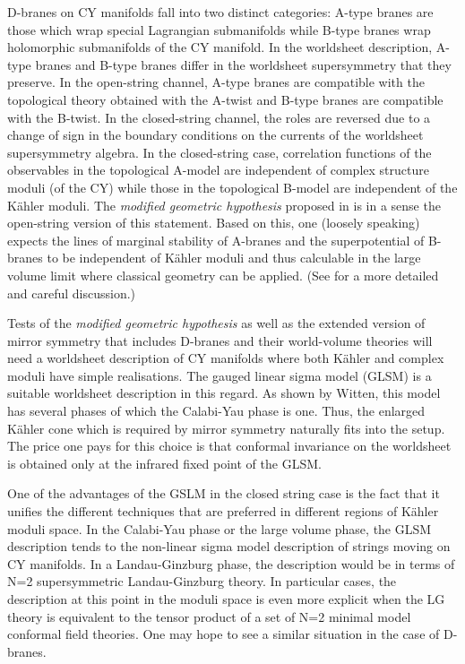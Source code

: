 \documentclass[a4paper,12pt]{article}
\begin{document}
D-branes on CY manifolds fall into two distinct categories: A-type branes
are those which wrap special Lagrangian submanifolds while B-type branes
wrap holomorphic submanifolds of the CY manifold. In the worldsheet
description\cite{ooy}, A-type branes and B-type branes differ in the
worldsheet supersymmetry that they preserve. In the open-string channel,
A-type branes are compatible with the topological theory obtained with the
A-twist and B-type branes are compatible with the B-twist. In the
closed-string channel, the roles are reversed due to a change of sign in
the boundary conditions on the \coordHE{} currents of the \coordHE{} worldsheet
supersymmetry algebra. In the closed-string case\cite{topwitten},
correlation functions of the observables in the topological A-model are
independent of complex structure moduli (of the CY) while those in the
topological B-model are independent of the K\"ahler moduli. The {\it
modified geometric hypothesis} proposed in \cite{quintic,doug1} is in a
sense the open-string version of this statement. Based on this, one
(loosely speaking) expects the lines of marginal stability of A-branes and
the superpotential of B-branes to be independent of K\"ahler moduli and
thus calculable in the large volume limit where classical geometry can be
applied. (See \cite{doug1} for a more detailed and careful discussion.)

Tests of the {\it modified geometric hypothesis} as well as the extended
version of mirror symmetry that includes D-branes and their world-volume
theories will need a worldsheet description of CY manifolds where both
K\"ahler and complex moduli have simple realisations. The gauged linear
sigma model (GLSM) is a suitable worldsheet description in this regard. 
As shown by Witten, this model has several phases of which the Calabi-Yau
phase is one. Thus, the enlarged K\"ahler cone which is required by mirror
symmetry naturally fits into the setup\cite{agm}.  The price one pays for
this choice is that conformal invariance on the worldsheet is obtained
only at the infrared fixed point of the GLSM. 

One of the advantages of the GSLM in the closed string case is the fact
that it unifies the different techniques that are preferred in different
regions of K\"ahler moduli space. In the Calabi-Yau phase or the large
volume phase, the GLSM description tends to the non-linear sigma model
description of strings moving on CY manifolds. In a Landau-Ginzburg phase,
the description would be in terms of N=2 supersymmetric Landau-Ginzburg
theory. In particular cases, the description at this point in the moduli
space is even more explicit when the LG theory is equivalent to the tensor
product of a set of N=2 minimal model conformal field theories. One may
hope to see a similar situation in the case of D-branes. 
\end{document}

